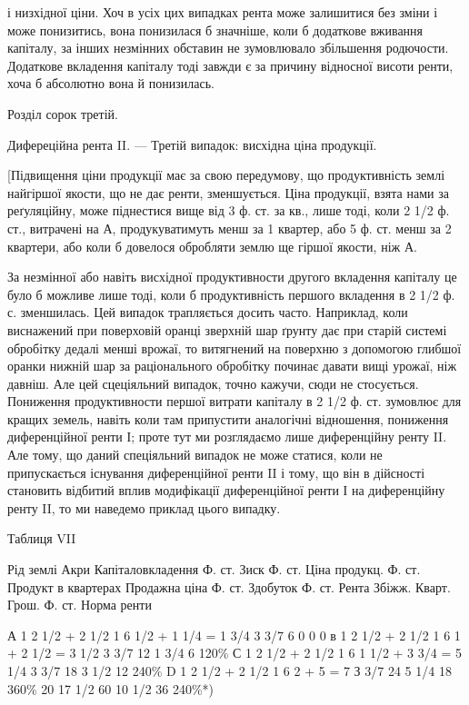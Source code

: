 і низхідної ціни. Хоч в усіх цих випадках рента може залишитися без зміни
і може понизитись, вона понизилася б значніше, коли б додаткове вживання
капіталу, за інших незмінних обставин не зумовлювало збільшення родючости. Додаткове вкладення
капіталу тоді завжди є за причину відносної висоти ренти,
хоча б абсолютно вона й понизилась.

Розділ сорок третій.

Дифереційна рента II. — Третій випадок:
висхідна ціна продукції.

[Підвищення ціни продукції має за свою передумову, що продуктивність землі
найгіршої якости, що не дає ренти, зменшується. Ціна продукції, взята нами за
реґуляційну, може піднестися вище від 3 ф. ст. за кв., лише тоді, коли 2 1/2 ф. ст.,
витрачені на А, продукуватимуть менш за 1 квартер, або 5 ф. ст. менш за
2 квартери, або коли б довелося обробляти землю ще гіршої якости, ніж А.

За незмінної або навіть висхідної продуктивности другого вкладення капіталу
це було б можливе лише тоді, коли б продуктивність першого вкладення в 2 1/2 ф. с.
зменшилась. Цей випадок трапляється досить часто. Наприклад, коли виснажений
при поверховій оранці зверхній шар ґрунту дає при старій системі обробітку
дедалі менші врожаї, то витягнений на поверхню з допомогою глибшої
оранки нижній шар за раціонального обробітку починає давати вищі
урожаї, ніж давніш. Але цей сцеціяльний випадок, точно кажучи, сюди не
стосується. Пониження продуктивности першої витрати капіталу в 2 1/2 ф. ст. зумовлює для кращих
земель, навіть коли там припустити аналогічні відношення,
пониження диференційної ренти І; проте тут ми розглядаємо лише диференційну
ренту II. Але тому, що даний спеціяльний випадок не може статися, коли не
припускається існування диференційної ренти II і тому, що він в дійсності
становить відбитий вплив модифікації диференційної ренти І на диференційну
ренту II, то ми наведемо приклад цього випадку.

Таблиця VII

Рід землі
Акри
Капіталовкладення Ф. ст.
Зиск Ф. ст.
Ціна продукц. Ф. ст.
Продукт в квартерах
Продажна ціна Ф. ст.
Здобуток Ф. ст.
Рента
Збіжж. Кварт.
Грош. Ф. ст.
Норма ренти

А    1    2  1/2 + 2 1/2     1    6      1/2 + 1 1/4 = 1 3/4     3 3/7      6                0      
        0           0
в    1    2  1/2 + 2 1/2     1     6      1 + 2 1/2 = 3 1/2        3 3/7     12               1 3/4 
     6        120\%
С    1    2  1/2 + 2 1/2    1     6      1 1/2 + 3 3/4 = 5 1/4  3 3/7     18               3 1/2    
 12        240\%
D    1    2  1/2 + 2 1/2    1    6       2 + 5 = 7                       З 3/7      24             5
1/4      18        360\%
                      20                                              17 1/2                        
60             10 1/2      36      240\%*)

